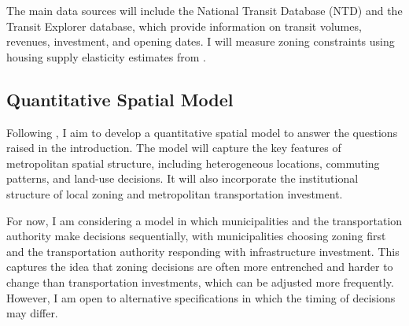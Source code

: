 \documentclass[12pt, a4paper]{article}
\begin{document}
The main data sources will include the National Transit Database (NTD) and the Transit Explorer database, which provide information on transit volumes, revenues, investment, and opening dates. I will measure zoning constraints using housing supply elasticity estimates from \textcite{Baum-Snow2024-ii}.

\subsection{Quantitative Spatial Model}
Following \citet{Severen2026-qx}, I aim to develop a quantitative spatial model to answer the questions raised in the introduction. The model will capture the key features of metropolitan spatial structure, including heterogeneous locations, commuting patterns, and land-use decisions. It will also incorporate the institutional structure of local zoning and metropolitan transportation investment.

For now, I am considering a model in which municipalities and the transportation authority make decisions sequentially, with municipalities choosing zoning first and the transportation authority responding with infrastructure investment. This captures the idea that zoning decisions are often more entrenched and harder to change than transportation investments, which can be adjusted more frequently. However, I am open to alternative specifications in which the timing of decisions may differ. 
\end{document}
